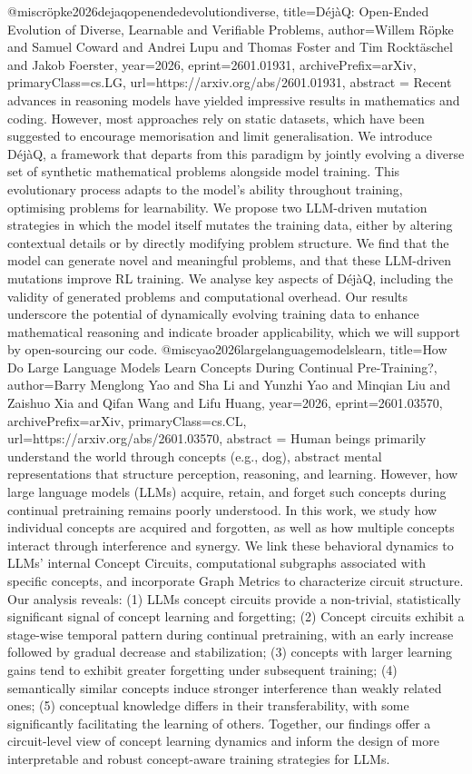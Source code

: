 {}@misc{röpke2026dejaqopenendedevolutiondiverse,
      title={D\'ej\`aQ: Open-Ended Evolution of Diverse, Learnable and Verifiable Problems}, 
      author={Willem Röpke and Samuel Coward and Andrei Lupu and Thomas Foster and Tim Rocktäschel and Jakob Foerster},
      year={2026},
      eprint={2601.01931},
      archivePrefix={arXiv},
      primaryClass={cs.LG},
      url={https://arxiv.org/abs/2601.01931},
      abstract = {Recent advances in reasoning models have yielded impressive results in mathematics and coding. However, most approaches rely on static datasets, which have been suggested to encourage memorisation and limit generalisation. We introduce DéjàQ, a framework that departs from this paradigm by jointly evolving a diverse set of synthetic mathematical problems alongside model training. This evolutionary process adapts to the model's ability throughout training, optimising problems for learnability. We propose two LLM-driven mutation strategies in which the model itself mutates the training data, either by altering contextual details or by directly modifying problem structure. We find that the model can generate novel and meaningful problems, and that these LLM-driven mutations improve RL training. We analyse key aspects of DéjàQ, including the validity of generated problems and computational overhead. Our results underscore the potential of dynamically evolving training data to enhance mathematical reasoning and indicate broader applicability, which we will support by open-sourcing our code.}
}@misc{yao2026largelanguagemodelslearn,
      title={How Do Large Language Models Learn Concepts During Continual Pre-Training?}, 
      author={Barry Menglong Yao and Sha Li and Yunzhi Yao and Minqian Liu and Zaishuo Xia and Qifan Wang and Lifu Huang},
      year={2026},
      eprint={2601.03570},
      archivePrefix={arXiv},
      primaryClass={cs.CL},
      url={https://arxiv.org/abs/2601.03570},
      abstract = {Human beings primarily understand the world through concepts (e.g., dog), abstract mental representations that structure perception, reasoning, and learning. However, how large language models (LLMs) acquire, retain, and forget such concepts during continual pretraining remains poorly understood. In this work, we study how individual concepts are acquired and forgotten, as well as how multiple concepts interact through interference and synergy. We link these behavioral dynamics to LLMs' internal Concept Circuits, computational subgraphs associated with specific concepts, and incorporate Graph Metrics to characterize circuit structure. Our analysis reveals: (1) LLMs concept circuits provide a non-trivial, statistically significant signal of concept learning and forgetting; (2) Concept circuits exhibit a stage-wise temporal pattern during continual pretraining, with an early increase followed by gradual decrease and stabilization; (3) concepts with larger learning gains tend to exhibit greater forgetting under subsequent training; (4) semantically similar concepts induce stronger interference than weakly related ones; (5) conceptual knowledge differs in their transferability, with some significantly facilitating the learning of others. Together, our findings offer a circuit-level view of concept learning dynamics and inform the design of more interpretable and robust concept-aware training strategies for LLMs.}
}
